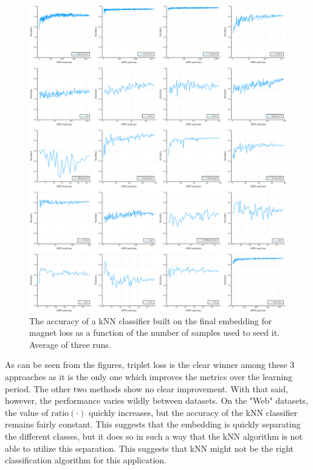 \begin{figure}[h]
  \centering
  \includegraphics[width=\textwidth]{images/magnet-toy/kNN/magnet-toy-kNN.pdf}
  \caption{The accuracy of a kNN classifier built on the final embedding for magnet loss as a function of the number of samples used to seed it. Average of three runs.}\label{fig:magnet-toy-kNN}
\end{figure}

As can be seen from the figures, triplet loss is the clear winner among these 3 approaches as it is the only one which improves the metrics over the learning period. The other two methods show no clear improvement. With that said, however, the performance varies wildly between datasets. On the "Web" datasets, the value of \( \mathrm{ratio} \left( \cdot \right) \) quickly increases, but the accuracy of the kNN classifier remains fairly constant. This suggests that the embedding is quickly separating the different classes, but it does so in such a way that the kNN algorithm is not able to utilize this separation. This suggests that kNN might not be the right classification algorithm for this application.

